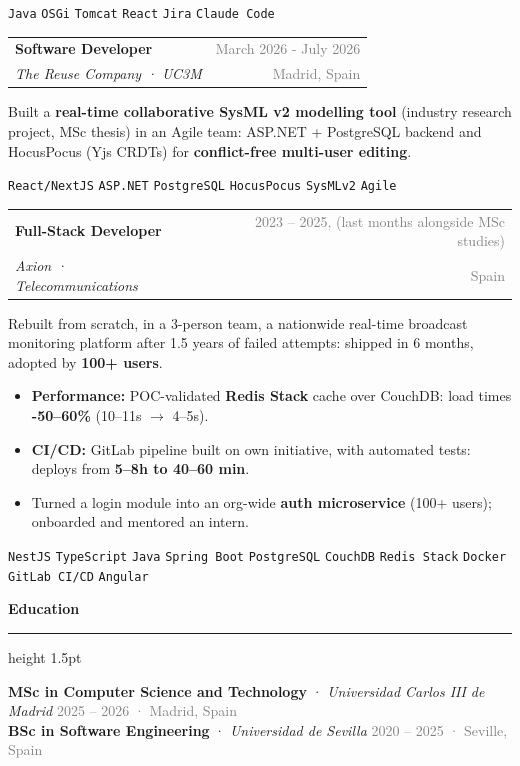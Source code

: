 \documentclass[9.5pt, a4paper]{article}
\newcommand{\cvsection}[1]{%
    \vspace{0.2cm}
    {\large \textbf{\textcolor{primary}{#1}}}
    \vspace{0.05cm}
    \textcolor{accent}{\hrule height 1.5pt}
    \vspace{0.1cm}
}
\newcommand{\cventry}[4]{%
    \noindent
    \begin{tabularx}{\textwidth}{Xr}
        \textbf{\textcolor{primary}{#1}} & \textcolor{gray}{\small #2} \\
        \textit{\textcolor{accent}{#3}} & \textcolor{gray}{\small #4}
    \end{tabularx}
    \vspace{0.1cm}
}
\newcommand{\tag}[1]{%
    \colorbox{tagbg}{\textcolor{accent}{\small\texttt{#1}}}%
}
\begin{document}
\vspace{0.1cm}
\noindent \tag{Java} \tag{OSGi} \tag{Tomcat} \tag{React} \tag{Jira} \tag{Claude Code}

\vspace{0.25cm}

\cventry{Software Developer}{March 2026 - July 2026}{The Reuse Company · UC3M}{Madrid, Spain}

\noindent Built a \textbf{real-time collaborative SysML v2 modelling tool} (industry research project, MSc thesis) in an Agile team: ASP.NET + PostgreSQL backend and HocusPocus (Yjs CRDTs) for \textbf{conflict-free multi-user editing}.

\vspace{0.1cm}
\noindent \tag{React/NextJS} \tag{ASP.NET} \tag{PostgreSQL} \tag{HocusPocus} \tag{SysMLv2} \tag{Agile}

\vspace{0.25cm}

\cventry{Full-Stack Developer}{2023 -- 2025, (last months alongside MSc studies)}{Axion · Telecommunications}{Spain}

\noindent Rebuilt from scratch, in a 3-person team, a nationwide real-time broadcast monitoring platform after 1.5 years of failed attempts: shipped in 6 months, adopted by \textbf{100+ users}.

\begin{itemize}[leftmargin=1.2em, itemsep=1pt, topsep=3pt]
    \item \textbf{Performance:} POC-validated \textbf{Redis Stack} cache over CouchDB: load times \textbf{-50--60\%} (10--11s $\rightarrow$ 4--5s).
    \item \textbf{CI/CD:} GitLab pipeline built on own initiative, with automated tests: deploys from \textbf{5--8h to 40--60 min}.
    \item Turned a login module into an org-wide \textbf{auth microservice} (100+ users); onboarded and mentored an intern.
\end{itemize}

\vspace{0.1cm}
\noindent \tag{NestJS} \tag{TypeScript} \tag{Java} \tag{Spring Boot} \tag{PostgreSQL} \tag{CouchDB} \tag{Redis Stack} \tag{Docker} \tag{GitLab CI/CD} \tag{Angular}

\cvsection{Education}
\noindent\textbf{\textcolor{primary}{MSc in Computer Science and Technology}} \textcolor{accent}{·} \textit{\textcolor{accent}{Universidad Carlos III de Madrid}} \hfill \textcolor{gray}{\small 2025 -- 2026 · Madrid, Spain}\\[2pt]
\textbf{\textcolor{primary}{BSc in Software Engineering}} \textcolor{accent}{·} \textit{\textcolor{accent}{Universidad de Sevilla}} \hfill \textcolor{gray}{\small 2020 -- 2025 · Seville, Spain}
\end{document}
